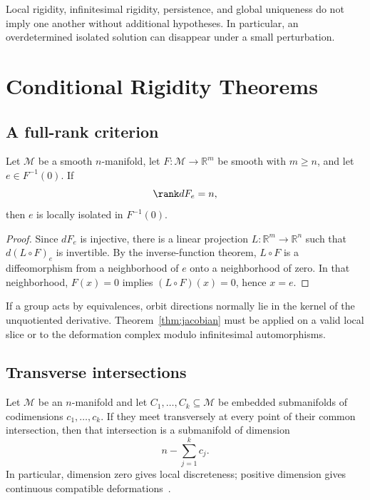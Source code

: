 \documentclass[11pt]{article}
\newcommand{\Mod}{\mathcal M}
\begin{document}
Local rigidity, infinitesimal rigidity, persistence, and global uniqueness do
not imply one another without additional hypotheses.  In particular, an
overdetermined isolated solution can disappear under a small perturbation.

\section{Conditional Rigidity Theorems}

\subsection{A full-rank criterion}

\begin{theorem}\label{thm:jacobian}
Let $\Mod$ be a smooth $n$-manifold, let
$F:\Mod\to\mathbb R^m$ be smooth with $m\ge n$, and let $e\in F^{-1}(0)$.
If
\[
 \rank dF_e=n,
\]
then $e$ is locally isolated in $F^{-1}(0)$.
\end{theorem}

\begin{proof}
Since $dF_e$ is injective, there is a linear projection
$L:\mathbb R^m\to\mathbb R^n$ such that
$d(L\circ F)_e$ is invertible.  By the inverse-function theorem,
$L\circ F$ is a diffeomorphism from a neighborhood of $e$ onto a neighborhood
of zero.  In that neighborhood,
$F(x)=0$ implies $(L\circ F)(x)=0$, hence $x=e$.
\end{proof}

\begin{remark}
If a group acts by equivalences, orbit directions normally lie in the kernel of
the unquotiented derivative.  Theorem~\ref{thm:jacobian} must be applied on a
valid local slice or to the deformation complex modulo infinitesimal
automorphisms.
\end{remark}

\subsection{Transverse intersections}

\begin{theorem}
\label{thm:transverse}
Let $\Mod$ be an $n$-manifold and let
$C_1,\ldots,C_k\subseteq\Mod$ be embedded submanifolds of codimensions
$c_1,\ldots,c_k$.  If they meet transversely at every point of their common
intersection, then that intersection is a submanifold of dimension
\[
 n-\sum_{j=1}^k c_j.
\]
In particular, dimension zero gives local discreteness; positive dimension
gives continuous compatible deformations~\cite{GuilleminPollack,Lee}.
\end{theorem}
\end{document}
